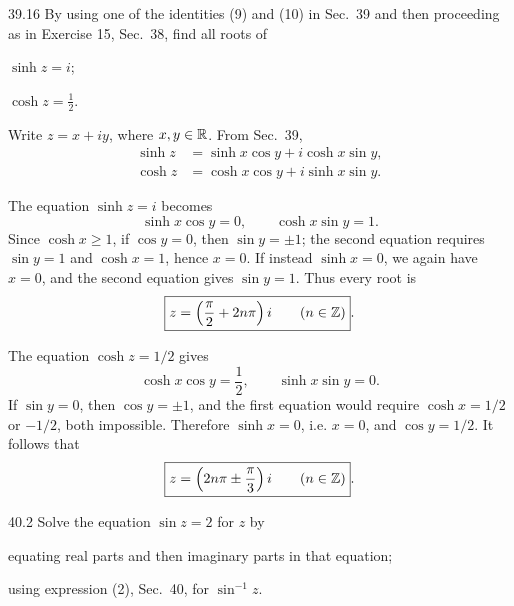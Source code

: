 \documentclass[11pt,oneside]{article}
\begin{document}
\begin{exercise}{39.16}
By using one of the identities (9) and (10) in Sec.~39 and then proceeding as in Exercise 15, Sec.~38, find all roots of
\begin{exercisesubparts}
    \item \(\sinh z=i\);
    \item \(\displaystyle\cosh z=\frac12\).
\end{exercisesubparts}
\end{exercise}

\begin{solution}
Write \(z=x+iy\), where \(x, y\in\mathbb{R}\). From Sec.~39,
\[
\begin{aligned}
    \sinh z&=\sinh x\cos y+i\cosh x\sin y, \\
    \cosh z&=\cosh x\cos y+i\sinh x\sin y.
\end{aligned}
\]
\begin{exercisesubparts}
    \item The equation \(\sinh z=i\) becomes
    \[
        \sinh x\cos y=0, \qquad \cosh x\sin y=1.
    \]
    Since \(\cosh x\ge1\), if \(\cos y=0\), then \(\sin y=\pm1\); the second equation requires \(\sin y=1\) and \(\cosh x=1\), hence \(x=0\). If instead \(\sinh x=0\), we again have \(x=0\), and the second equation gives \(\sin y=1\). Thus every root is
    \[
        \boxed{z=\left(\frac\pi2+2n\pi\right)i\qquad(n\in\mathbb{Z})}.
    \]
    \item The equation \(\cosh z=1/2\) gives
    \[
        \cosh x\cos y=\frac12, \qquad \sinh x\sin y=0.
    \]
    If \(\sin y=0\), then \(\cos y=\pm1\), and the first equation would require \(\cosh x=1/2\) or \(-1/2\), both impossible. Therefore \(\sinh x=0\), i.e. \(x=0\), and \(\cos y=1/2\). It follows that
    \[
        \boxed{z=\left(2n\pi\pm\frac\pi3\right)i\qquad(n\in\mathbb{Z})}.
    \]
\end{exercisesubparts}
\end{solution}

\begin{exercise}{40.2}
Solve the equation \(\sin z=2\) for \(z\) by
\begin{exercisesubparts}
    \item equating real parts and then imaginary parts in that equation;
    \item using expression (2), Sec.~40, for \(\sin^{-1}z\).
\end{exercisesubparts}
\end{exercise}
\end{document}
